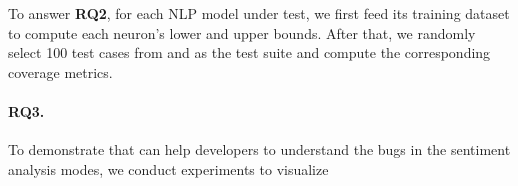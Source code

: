 To answer {\bf RQ2}, for each NLP model under test, we first feed its training dataset to compute each neuron's lower and upper bounds. After that, we randomly select 100  test cases from \tool and \Cklst as the test suite and compute the corresponding coverage metrics. 

%
%

\paragraph{RQ3.} To demonstrate that \tool can help developers to understand the bugs in the sentiment analysis modes, we conduct experiments to visualize 




